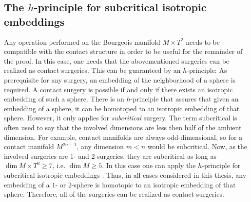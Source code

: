 \subsection{The $h$-principle for subcritical isotropic embeddings}
Any operation performed on the Bourgeois manifold $M\times T^2$ needs to be compatible with the contact structure
in order to be useful for the remainder of the proof.
In this case, one needs that the abovementioned surgeries can be realized as contact surgeries.
This can be guaranteed by an $h$-principle:
As prerequisite for any surgery, an embedding of the neighborhood of a sphere is required. 
A contact surgery is possible if and only if there exists an isotropic embedding of such a sphere.
There is an $h$-principle that assures that given an embedding of a sphere, it can be homotoped to an isotropic embedding of that sphere.
However, it only applies for \textit{subcritical} surgery.
The term subcritical is often used to say that the involved dimensions are less then half of the ambient dimension.
For example, contact manifolds are always odd-dimensional, so for a contact manifold $M^{2n+1}$, any dimension $m < n$ would be subcritical.
Now, as the involved surgeries are $1$- and $2$-surgeries, they are subcritical as long as $\dim M\times T^2 \geq 7$, i.e. $\dim M \geq 5$.
In this case one can apply the $h$-principle for subcritical isotropic embeddings \cite[12.4.1]{EM02}.
Thus, in all cases considered in this thesis, any embedding of a $1$- or $2$-sphere is homotopic to an isotropic embedding of that sphere.
Therefore, all of the surgeries can be realized as contact surgeries.